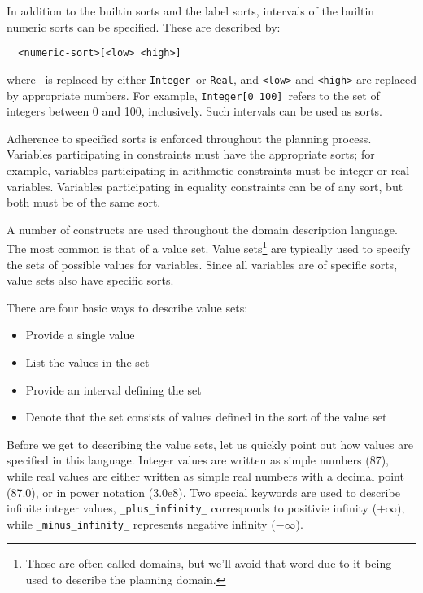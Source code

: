 In addition to the builtin sorts and the label sorts, intervals of the 
builtin numeric sorts can be specified.  These are described by:
  \begin{verbatim}
  <numeric-sort>[<low> <high>] \end{verbatim}
where {\tt <numeric-sort>}\ is replaced by either {\tt Integer}\ or
{\tt Real}, and {\tt <low>} and {\tt <high>} are replaced by
appropriate numbers.  For example, {\tt Integer[0 100]}\ refers to the
set of integers between 0 and 100, inclusively.  Such intervals can be
used as sorts.

  Adherence to specified sorts is enforced throughout the planning
process.  Variables participating in constraints must have the
appropriate sorts; for example, variables participating in arithmetic
constraints must be integer or real variables. Variables participating
in equality constraints can be of any sort, but both must be of the
same sort.





A number of constructs are used throughout the domain description
language.  The most common is that of a value set. Value
sets\footnote{Those are often called domains, but we'll avoid that
word due to it being used to describe the planning domain.} are
typically used to specify the sets of possible values for variables.
Since all variables are of specific sorts, value sets also have
specific sorts.  

There are four basic ways to describe value sets:
  \begin{itemize}
  \item Provide a single value
  \item List the values in the set
  \item Provide an interval defining the set
  \item Denote that the set consists of values defined in the sort of
the value set
  \end{itemize}

Before we get to describing the value sets, let us quickly point out
how values are specified in this language.  Integer values are written
as simple numbers (87), while real values are either written as simple
real numbers with a decimal point (87.0), or in power notation
(3.0e8).  Two special keywords are used to describe infinite integer
values, {\tt \_plus\_infinity\_} corresponds to positivie infinity
($+\infty$), while {\tt \_minus\_infinity\_} represents negative infinity
($-\infty$).

